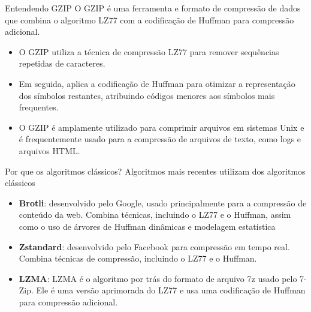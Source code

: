 \documentclass{beamer}
\begin{document}
    \begin{frame}{Entendendo GZIP}
        O GZIP é uma ferramenta e formato de compressão de dados que combina o algoritmo LZ77 com a codificação de Huffman para compressão adicional.
        \begin{itemize}
            \item O GZIP utiliza a técnica de compressão LZ77 para remover sequências repetidas de caracteres.
            \item Em seguida, aplica a codificação de Huffman para otimizar a representação dos símbolos restantes, atribuindo códigos menores aos símbolos mais frequentes.
            \item O GZIP é amplamente utilizado para comprimir arquivos em sistemas Unix e é frequentemente usado para a compressão de arquivos de texto, como logs e arquivos HTML.
        \end{itemize}
    \end{frame}

    \begin{frame}{Por que os algoritmos clássicos?}
        Algoritmos mais recentes utilizam dos algoritmos clássicos
        \begin{itemize}
            \item \textbf{Brotli}: desenvolvido pelo Google, usado principalmente para a compressão de conteúdo da web.
            Combina técnicas, incluindo o LZ77 e o Huffman, assim como o uso de árvores de Huffman dinâmicas e modelagem estatística
            \item \textbf{Zstandard}: desenvolvido pelo Facebook para compressão em tempo real. Combina técnicas de
            compressão, incluindo o LZ77 e o Huffman.
            \item \textbf{LZMA}: LZMA é o algoritmo por trás do formato de arquivo 7z usado pelo 7-Zip. Ele é uma versão
            aprimorada do LZ77 e usa uma codificação de Huffman para compressão adicional.
        \end{itemize}
    \end{frame}

\end{document}
